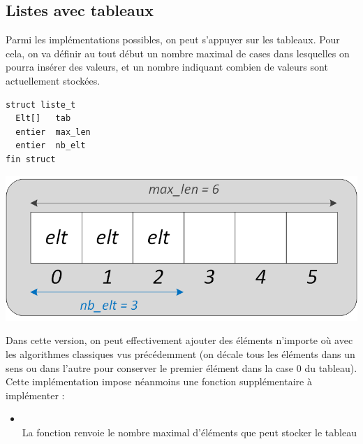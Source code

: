 \documentclass[11pt,a4paper]{article}
\begin{document}
\bigskip


\subsection{Listes avec tableaux}

\bigskip

Parmi les implémentations possibles, on peut s'appuyer sur les tableaux.
Pour cela, on va définir au tout début un nombre maximal de cases dans lesquelles on pourra insérer des valeurs, et un nombre indiquant combien de valeurs sont actuellement stockées.

\begin{table}[h!]
  \centering
  \begin{minipage}{0.4\textwidth}
    \centering
\begin{lstlisting}[style=algorithmique]
struct liste_t
  Elt[]   tab
  entier  max_len
  entier  nb_elt
fin struct \end{lstlisting}
  \end{minipage}
  \hfillx
  \begin{minipage}{0.55\textwidth}
    \centering
\includegraphics[scale=0.75]{img/listes/Listes_Tableau_1_Structure_Detaillee.png}
  \end{minipage}
\end{table}

Dans cette version, on peut effectivement ajouter des éléments n'importe où avec les algorithmes classiques vus précédemment (on décale tous les éléments dans un sens ou dans l'autre pour conserver le premier élément dans la case $ 0 $ du tableau).
Cette implémentation impose néanmoins une fonction supplémentaire à implémenter :

\begin{itemize}
\item {}\\
      La fonction renvoie le nombre maximal d'éléments que peut stocker le tableau
\end{itemize}
\end{document}
